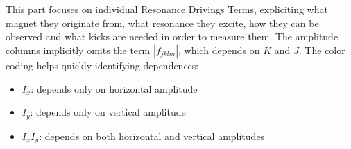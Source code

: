 \section{}

This part focuses on individual Resonance Drivings Terms, expliciting what magnet they originate
from, what resonance they excite, how they can be observed and what kicks are needed in order to
measure them.  The amplitude columns implicitly omits the term $|f_{jklm}|$, which depends on $K$
and $J$. The color coding helps quickly identifying dependences:

\begin{itemize}
\tightlist
\item
  \colorbox{orange!20}{$I_x$}: depends only on horizontal amplitude
\item
  \colorbox{red!20}{$I_y$}: depends only on vertical amplitude
\item
  \colorbox{blue!20}{$I_x I_y$}: depends on both horizontal and vertical
  amplitudes
\end{itemize}


